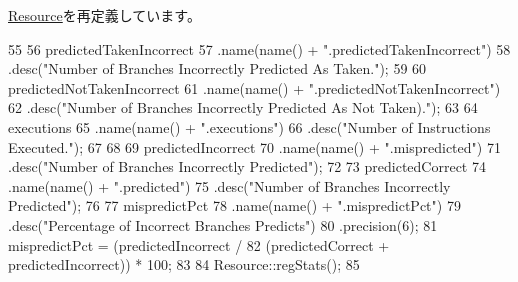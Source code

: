 \hyperlink{classResource_ac1739a9be0fbd5d96cf441cd3b2c1c78}{Resource}を再定義しています。


\begin{DoxyCode}
55 {
56     predictedTakenIncorrect
57         .name(name() + ".predictedTakenIncorrect")
58         .desc("Number of Branches Incorrectly Predicted As Taken.");
59 
60     predictedNotTakenIncorrect
61         .name(name() + ".predictedNotTakenIncorrect")
62         .desc("Number of Branches Incorrectly Predicted As Not Taken).");
63 
64     executions
65         .name(name() + ".executions")
66         .desc("Number of Instructions Executed.");
67 
68  
69     predictedIncorrect
70         .name(name() + ".mispredicted")
71         .desc("Number of Branches Incorrectly Predicted");
72 
73     predictedCorrect
74         .name(name() + ".predicted")
75         .desc("Number of Branches Incorrectly Predicted");
76 
77     mispredictPct
78         .name(name() + ".mispredictPct")
79         .desc("Percentage of Incorrect Branches Predicts")
80         .precision(6);
81     mispredictPct = (predictedIncorrect / 
82                      (predictedCorrect + predictedIncorrect)) * 100;
83 
84     Resource::regStats();
85 }
\end{DoxyCode}


